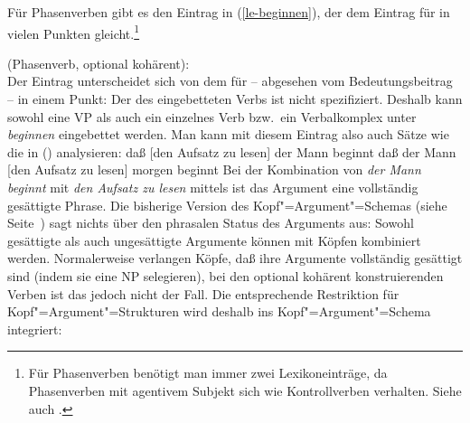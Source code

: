 {Für Phasenverben gibt es den Eintrag in (\ref{le-beginnen}), der dem Eintrag für 
in vielen Punkten gleicht.\footnote{\label{fn-phase-verbs-control}%
        Für Phasenverben benötigt man immer zwei Lexikoneinträge, da Phasenverben
        mit agentivem Subjekt sich wie Kontrollverben verhalten. Siehe auch .%
}

\eas
\label{le-beginnen}
 (Phasenverb, optional kohärent):\\
\zs
Der Eintrag unterscheidet sich von dem für  -- abgesehen vom Bedeutungsbeitrag -- in einem Punkt:
Der \lexw des eingebetteten Verbs ist nicht spezifiziert. Deshalb kann sowohl eine VP als auch ein einzelnes
Verb bzw.\ ein Verbalkomplex unter \emph{beginnen} eingebettet werden. Man kann mit diesem Eintrag also auch Sätze
wie die in () analysieren:
\eal
\ex daß [den Aufsatz zu lesen] der Mann beginnt
\ex daß der Mann [den Aufsatz zu lesen] morgen beginnt
\zl
Bei der Kombination von \emph{der Mann beginnt} mit \emph{den Aufsatz zu lesen} mittels \kasch
ist das Argument eine vollständig gesättigte Phrase. Die bisherige Version des
Kopf"=Argument"=Schemas (siehe Seite~\pageref{schema-bin}) sagt nichts über den phrasalen Status des Arguments aus: Sowohl gesättigte
als auch ungesättigte Argumente können mit Köpfen kombiniert werden. Normalerweise verlangen Köpfe,
daß ihre Argumente vollständig gesättigt sind (\zb indem sie eine NP selegieren), bei den optional
kohärent konstruierenden Verben ist das jedoch nicht der Fall. Die entsprechende Restriktion für
Kopf"=Argument"=Strukturen wird deshalb ins Kopf"=Argument"=Schema integriert:

}
